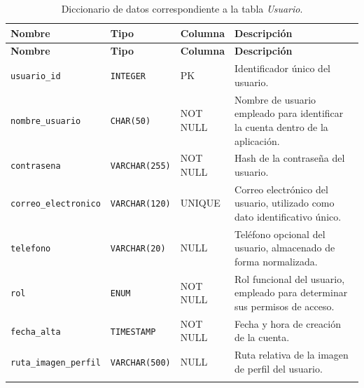 \begin{longtable}{@{}
		>{\RaggedRight\arraybackslash}p{}
		>{\RaggedRight\arraybackslash}p{}
		>{\RaggedRight\arraybackslash}p{}
		>{\RaggedRight\arraybackslash}p{}
		@{}}
	
	\toprule
	\textbf{Nombre} & \textbf{Tipo} & \textbf{Columna} & \textbf{Descripción} \\
	\midrule
	\endfirsthead
	
	\toprule
	\textbf{Nombre} & \textbf{Tipo} & \textbf{Columna} & \textbf{Descripción} \\
	\midrule
	\endhead
	
	\texttt{usuario\_id} 
	& \texttt{INTEGER} 
	& PK 
	& Identificador único del usuario. \\
	
	\texttt{nombre\_\allowbreak{}usuario} 
	& \texttt{CHAR(50)} 
	& \makecell[l]{NOT\\NULL} 
	& Nombre de usuario empleado para identificar la cuenta dentro de la aplicación. \\
	
	\texttt{contrasena} 
	& \texttt{VARCHAR(255)} 
	& \makecell[l]{NOT\\NULL} 
	& Hash de la contraseña del usuario. \\
	
	\texttt{correo\_\allowbreak{}electronico} 
	& \texttt{VARCHAR(120)} 
	& UNIQUE 
	& Correo electrónico del usuario, utilizado como dato identificativo único. \\
	
	\texttt{telefono} 
	& \texttt{VARCHAR(20)} 
	& NULL 
	& Teléfono opcional del usuario, almacenado de forma normalizada. \\
	
	\texttt{rol} 
	& \texttt{ENUM} 
	& \makecell[l]{NOT\\NULL} 
	& Rol funcional del usuario, empleado para determinar sus permisos de acceso. \\
	
	\texttt{fecha\_\allowbreak{}alta} 
	& \texttt{TIMESTAMP} 
	& \makecell[l]{NOT\\NULL} 
	& Fecha y hora de creación de la cuenta. \\
	
	\texttt{ruta\_\allowbreak{}imagen\_\allowbreak{}perfil} 
	& \texttt{VARCHAR(500)} 
	& NULL 
	& Ruta relativa de la imagen de perfil del usuario. \\
	
	\bottomrule
	\caption{Diccionario de datos correspondiente a la tabla \textit{Usuario}.}
	\label{tab:diccionario_usuario}
\end{longtable}

